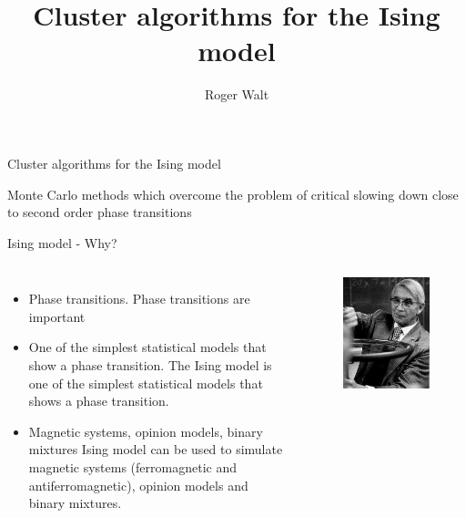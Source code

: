 \documentclass[handout]{beamer}
\begin{document}
\title{Cluster algorithms for the Ising model}
\author{Roger Walt}

\begin{frame}
	\huge{Cluster algorithms for the Ising model}
	\vspace*{5pt}

	\Large{Monte Carlo methods which overcome the problem of critical slowing down close to second order phase transitions}
\end{frame}

\begin{frame}{Ising model - Why?}
\begin{columns}[c]
	\begin{itemize}
		\item<1-> Phase transitions.
			 {Phase transitions are important}
		\item<2-> One of the simplest statistical models that show a phase transition.
			 {The Ising model is one of the simplest statistical models that shows a phase transition.}
		\item<3-> Magnetic systems, opinion models, binary mixtures
			 {Ising model can be used to simulate magnetic systems (ferromagnetic and antiferromagnetic), opinion models and binary mixtures.}
	\end{itemize}
	\pause[4]
	\begin{figure}[p]
		\centering
		\includegraphics{img/ising.jpg}

\end{figure}
\end{columns}
\end{frame}
\end{document}
